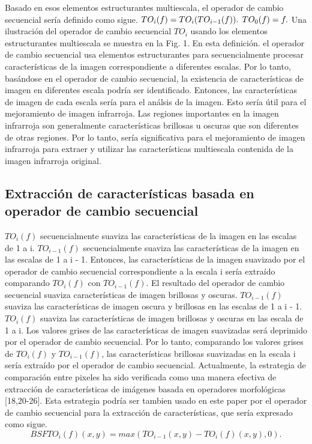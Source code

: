 \documentclass[a4paper, 11 pt, conference]{ieeeconf}      %
\begin{document}
Basado en esos elementos estructurantes multiescala, el operador de cambio secuencial ser\'ia definido como sigue.
$\\\\
TO_i(f) = TO_i(TO_{i-1}(f)).
$
$\\
TO_0(f) = f.\\\\
$
Una ilustraci\'on del operador de cambio secuencial $TO_i$ usando los elementos estructurantes multiescala se muestra en la Fig. 1. En esta definici\'on. el operador de cambio secuencial usa elementos estructurantes para secuencialmente procesar caracter\'isticas de la imagen correspondiente a diferentes escalas. Por lo tanto, bas\'andose en el operador de cambio secuencial, la existencia de caracter\'isticas de imagen en diferentes escala podr\'ia ser identificado. Entonces, las caracter\'isticas de imagen de cada escala ser\'ia para el an\'alsis de la imagen. Esto ser\'ia \'util para el mejoramiento de imagen infrarroja.
Las regiones importantes en la imagen infrarroja son generalmente caracter\'isticas brillosas u oscuras que son diferentes de otras regiones. Por lo tanto, ser\'ia significativa para el mejoramiento de imagen infrarroja para extraer y utilizar las caracter\'isticas multiescala contenida de la imagen infrarroja original.

\subsection{Extracci\'on de caracter\'isticas basada en operador de cambio secuencial}
$TO_i(f)$ secuencialmente suaviza las caracter\'isticas de la imagen en las escalas de 1 a i. $TO_{i-1}(f)$ secuencialmente suaviza las caracter\'isticas de la imagen en las escalas de 1 a i - 1. Entonces, las caracter\'isticas de la imagen suavizado por el operador de cambio secuencial correspondiente a la escala i ser\'ia extra\'ido comparando $TO_i(f) $ con $TO_{i-1}(f)$.
El resultado del operador de cambio secuencial suaviza caracter\'isticas de imagen brillosas y oscuras. $TO_{i-1}(f)$ suaviza las caracter\'isticas de imagen oscura y brillosas en las escalas de 1 a i - 1. $TO_i(f)$ suaviza las caracter\'isticas de imagen brillosas y oscuras en las escala de 1 a i. Los valores grises de las caracter\'isticas de imagen suavizadas ser\'a deprimido por el operador de cambio secuencial. Por lo tanto, comparando los valores grises de $TO_i(f)$ y $TO_{i-1}(f)$, las caracter\'isticas brillosas suavizadas en la escala i ser\'ia extra\'ido por el operador de cambio secuencial. Actualmente, la estrategia de comparaci\'on entre pixeles ha sido verificada como una manera efectiva de extracci\'on de caracter\'isticas de im\'agenes basada en operadores morfol\'ogicas [18,20-26]. Esta estrategia podr\'ia ser tambien usado en este paper por el operador de cambio secuencial para la extracci\'on de caracter\'isticas, que ser\'ia expresado como sigue.
$$
BSFTO_i(f)(x,y) = max(TO_{i-1}(x,y) - TO_i(f)(x,y),0).
$$
\end{document}
